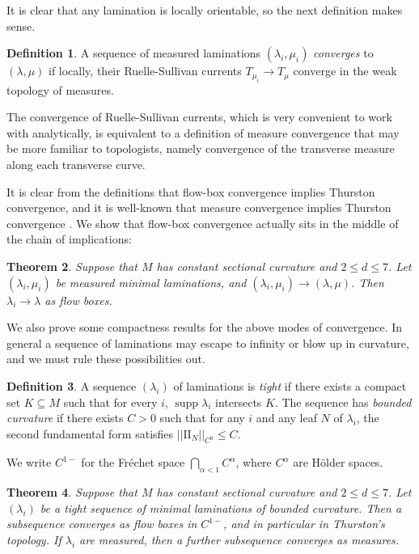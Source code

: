 \documentclass[reqno,11pt]{amsart}
\DeclareMathOperator{\supp}{supp}
\newcommand{\Two}{\mathrm{I\!I}}
\newcommand{\dfn}[1]{\emph{#1}\index{#1}}
\newtheorem{theorem}{Theorem}[section]
\theoremstyle{definition}
\newtheorem{definition}[theorem]{Definition}
\numberwithin{equation}{section}
\begin{document}
It is clear that any lamination is locally orientable, so the next definition makes sense.

\begin{definition}
A sequence of measured laminations $(\lambda_i, \mu_i)$ \dfn{converges} to $(\lambda, \mu)$ if locally, their Ruelle-Sullivan currents $T_{\mu_i} \to T_\mu$ converge in the weak topology of measures.
\end{definition}

The convergence of Ruelle-Sullivan currents, which is very convenient to work with analytically, is equivalent to a definition of measure convergence that may be more familiar to topologists, namely convergence of the transverse measure along each transverse curve.

It is clear from the definitions that flow-box convergence implies Thurston convergence, and it is well-known that measure convergence implies Thurston convergence \cite[Proposition 8.10.3]{thurston1979geometry}.
We show that flow-box convergence actually sits in the middle of the chain of implications:

\begin{theorem}\label{implication theorem}
Suppose that $M$ has constant sectional curvature and $2 \leq d \leq 7$.
Let $(\lambda_i, \mu_i)$ be measured minimal laminations, and $(\lambda_i, \mu_i) \to (\lambda, \mu)$. Then $\lambda_i \to \lambda$ as flow boxes.
\end{theorem}

We also prove some compactness results for the above modes of convergence.
In general a sequence of laminations may escape to infinity or blow up in curvature, and we must rule these possibilities out.

\begin{definition}
A sequence $(\lambda_i)$ of laminations is \dfn{tight} if there exists a compact set $K \subseteq M$ such that for every $i$, $\supp \lambda_i$ intersects $K$.
The sequence has \dfn{bounded curvature} if there exists $C > 0$ such that for any $i$ and any leaf $N$ of $\lambda_i$, the second fundamental form satisfies $||\Two_N||_{C^0} \leq C$.
\end{definition}

We write $C^{1-}$ for the Fr\'echet space $\bigcap_{\alpha < 1} C^\alpha$, where $C^\alpha$ are H\"older spaces.

\begin{theorem}\label{compactness theorem}
Suppose that $M$ has constant sectional curvature and $2 \leq d \leq 7$.
Let $(\lambda_i)$ be a tight sequence of minimal laminations of bounded curvature.
Then a subsequence converges as flow boxes in $C^{1-}$, and in particular in Thurston's topology.
If $\lambda_i$ are measured, then a further subsequence converges as measures.
\end{theorem}
\end{document}
